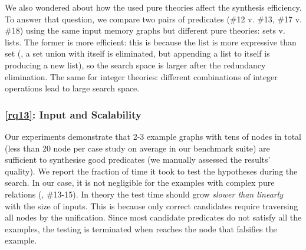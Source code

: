 We also wondered about how the used pure theories affect the
synthesis efficiency.
%
To answer that question, we compare two pairs of predicates (\#12 v.
\#13, \#17 v. \#18) using the same input memory graphs but different
pure theories: sets v. lists. The former is more efficient: this is
because the list is more expressive than set (\eg, a set union with
itself is eliminated, but appending a list to itself is producing a
new list), so the search space is larger after the redundancy
elimination. The same for integer theories: different
combinations of integer operations lead to large search space.

\subsubsection*{\ref{rq13}: Input and Scalability}
Our experiments demonstrate that 2-3 example graphs with tens of nodes
in total (less than 20 node per case study on average in our benchmark
suite) are sufficient to synthesise good predicates (we manually
assessed the results' quality).
%
We report the
fraction of time it took to test the hypotheses during the search.
%
%
In our case, it is not negligible for the examples with complex pure
relations (\eg, \#13-15).
%
In theory the test time should grow \emph{slower than linearly} with
the size of inputs. This is because only correct candidates require
traversing all nodes by the \prolog unification. Since most candidate
predicates do not satisfy all the examples, the testing is terminated
when \prolog reaches the node that falsifies the example.


